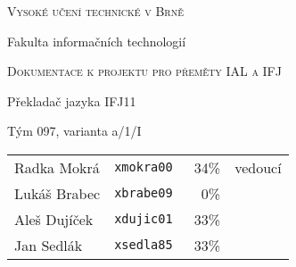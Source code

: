 \thispagestyle{empty}

\begin{center}
\Large{\scshape Vysoké učení technické v Brně}

\vspace{0.5cm}

\large{Fakulta informačních technologií}

\vfill

\Large{\scshape Dokumentace k projektu pro přeměty IAL a IFJ}

%

\vfill

\LARGE{Překladač jazyka IFJ11}

\vfill

\large{Tým 097, varianta a/1/I}
\end{center}

\vspace{0.5cm}

\begin{tabular}{l l r l}
Radka Mokrá  & \tt{xmokra00} & 34\% & vedoucí \\ 
Lukáš Brabec & \tt{xbrabe09} &  0\% & \\
Aleš Dujíček & \tt{xdujic01} & 33\% & \\
Jan Sedlák   & \tt{xsedla85} & 33\% & \\
\end{tabular}


\newpage{}
